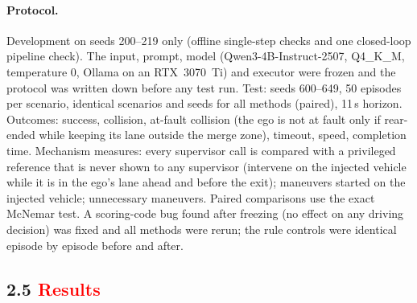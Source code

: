 \documentclass[11pt]{article}
\newcommand{\rev}[1]{\textcolor{red}{#1}}
\newenvironment{revblock}{\color{red}}{}
\begin{document}
\begin{revblock}
\paragraph{Protocol.} Development on seeds 200--219 only (offline single-step checks and one closed-loop pipeline
check). The input, prompt, model (Qwen3-4B-Instruct-2507, Q4\_K\_M, temperature 0, Ollama on an RTX~3070~Ti) and
executor were frozen and the protocol was written down before any test run. Test: seeds 600--649, 50 episodes per
scenario, identical scenarios and seeds for all methods (paired), 11\,s horizon. Outcomes: success, collision,
at-fault collision (the ego is not at fault only if rear-ended while keeping its lane outside the merge zone),
timeout, speed, completion time. Mechanism measures: every supervisor call is compared with a privileged reference that
is never shown to any supervisor (intervene on the injected vehicle while it is in the ego's lane ahead and before the
exit); maneuvers started on the injected vehicle; unnecessary maneuvers. Paired comparisons use the exact McNemar test.
A scoring-code bug found after freezing (no effect on any driving decision) was fixed and all methods were rerun; the
rule controls were identical episode by episode before and after.
\end{revblock}

\subsection*{2.5 \rev{Results}}
\end{document}
